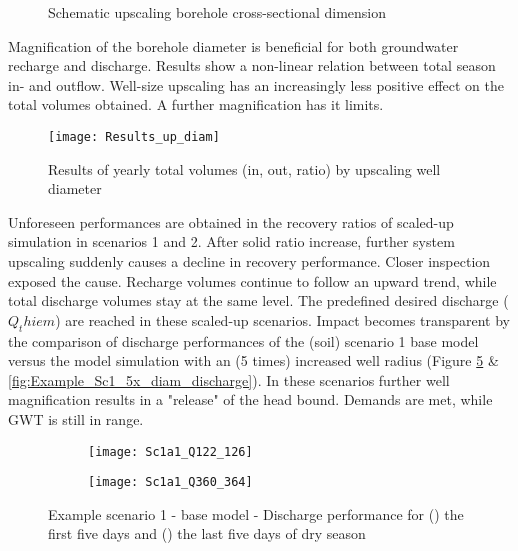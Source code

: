 \begin{figure}[h!]
\centering
{}
\captionsetup{justification=centering}
\caption{Schematic upscaling borehole cross-sectional dimension}
\label{fig:Schematic_up_diam}
\end{figure}

Magnification of the borehole diameter is beneficial for both groundwater recharge and discharge. Results show a non-linear relation between total season in- and outflow. Well-size upscaling has an increasingly less positive effect on the total volumes obtained. A further magnification has it limits.  

\begin{figure}[h!]
 \centering
 \texttt{[image: Results\_up\_diam]}
 \captionsetup{justification=centering} 
 \caption{Results of yearly total volumes (in, out, ratio) by upscaling well diameter}
 \label{fig:Results_up_diam}
\end{figure}

Unforeseen performances are obtained in the recovery ratios of scaled-up simulation in scenarios 1 and 2. After solid ratio increase, further system upscaling suddenly causes a decline in recovery performance. Closer inspection exposed the cause. Recharge volumes continue to follow an upward trend, while total discharge volumes stay at the same level. The predefined desired discharge ($Q_thiem$) are reached in these scaled-up scenarios. Impact becomes transparent by the comparison of discharge performances of the (soil) scenario 1 base model versus the model simulation with an (5 times) increased well radius (Figure \ref{fig:Example_Sc1_base_discharge} \& \ref{fig:Example_Sc1_5x_diam_discharge}). In these scenarios further well magnification results in a "release" of the head bound. Demands are met, while GWT is still in range. 

\begin{figure}[H]
	\centering
	\begin{subfigure}[b]{0.5\linewidth}
		\centering\texttt{[image: Sc1a1\_Q122\_126]}
		\captionsetup{justification=centering}		
		\caption{\label{fig:Sc1a1_Q122_126}}
		\end{subfigure}\hfill
	\begin{subfigure}[b]{0.5\linewidth}
        \centering\texttt{[image: Sc1a1\_Q360\_364]}
		\captionsetup{justification=centering}		
		\caption{\label{fig:Sc1a1_Q360_364}}
		\end{subfigure}
		\captionsetup{justification=centering}	
	\caption{Example scenario 1 - base model - Discharge performance for () the first five days and () the last five days of dry season} 
	\label{fig:Example_Sc1_base_discharge}
\end{figure} 

